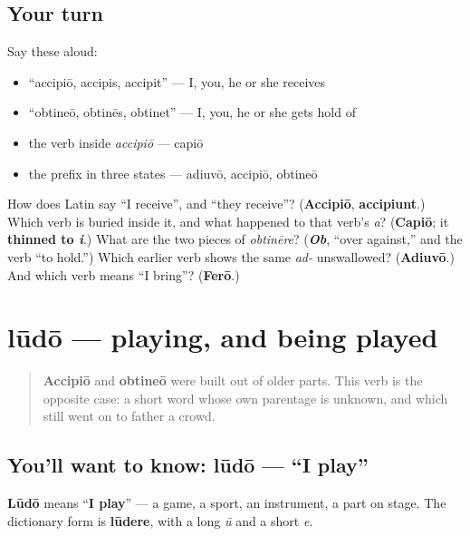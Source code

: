 \subsection*{Your turn}
Say these aloud:

\begin{itemize}
\raggedright
  \item \textquotedblleft{}accipiō, accipis, accipit\textquotedblright{} — I, you, he or she receives
  \item \textquotedblleft{}obtineō, obtinēs, obtinet\textquotedblright{} — I, you, he or she gets hold of
  \item the verb inside \emph{accipiō} — capiō
  \item the prefix in three states — adiuvō, accipiō, obtineō
\end{itemize}

\begin{tcolorbox}[breakable,colback=teal!4,colframe=teal!35!black,title={Before you move on}]
How does Latin say \textquotedblleft{}I receive\textquotedblright{}, and \textquotedblleft{}they receive\textquotedblright{}? (\textbf{Accipiō}, \textbf{accipiunt}.) Which verb is buried inside it, and what happened to that verb's \emph{a}? (\textbf{Capiō}; it \textbf{thinned to \emph{i}}.) What are the two pieces of \emph{obtinēre}? (\emph{\textbf{Ob}}, \textquotedblleft{}over against,\textquotedblright{} and the verb \textquotedblleft{}to hold.\textquotedblright{}) Which earlier verb shows the same \emph{ad-} unswallowed? (\textbf{Adiuvō}.) And which verb means \textquotedblleft{}I bring\textquotedblright{}? (\textbf{Ferō}.)
\end{tcolorbox}
\section[lūdō, lūdere]{lūdō — playing, and being played}

\label{lesson:LA-C42-ludo}



\begin{quote}
\textbf{Accipiō} and \textbf{obtineō} were built out of older parts. This verb is the opposite case: a short word whose own parentage is unknown, and which still went on to father a crowd.
\end{quote}

\subsection*{You'll want to know: lūdō — \textquotedblleft{}I play\textquotedblright{}}
\textbf{Lūdō} means \textquotedblleft{}\textbf{I play}\textquotedblright{} — a game, a sport, an instrument, a part on stage. The dictionary form is \textbf{lūdere}, with a long \emph{ū} and a short \emph{e}.

